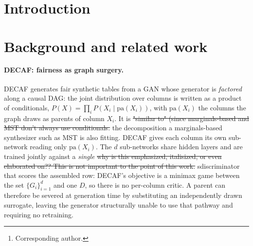 \documentclass{article}
\title{\wkTitle}
\author{%
  Steven Golob\thanks{Corresponding author.} \\
  University of Washington Tacoma \\
  \texttt{golobs@uw.edu} \\
  \And
  Sikha Pentyala \\
  University of Washington Tacoma \\
  \And
  Martine De Cock \\
  University of Washington Tacoma \\
}
\begin{document}
\maketitle

\begin{abstract}
\wkAbstract
\end{abstract}

\section{Introduction}
\wkIntro

\section{Background and related work}
\label{sec:related}

\paragraph{DECAF: fairness as graph surgery.}
DECAF \citep{vanbreugel2021decaf} generates fair synthetic tables from a GAN whose
generator is \emph{factored} along a causal DAG: the joint distribution over
columns is written as a product of conditionals, $P(X) = \prod_i P(X_i \mid
\mathrm{pa}(X_i))$, with $\mathrm{pa}(X_i)$ the columns the graph draws as parents
of column $X_i$. It is \st{"similar to" (since marginals-based and MST don't always use conditionals. } the decomposition a marginals-based synthesizer such as MST
is also fitting. DECAF gives each column its own sub-network reading only
$\mathrm{pa}(X_i)$. The $d$ sub-networks share hidden layers and are trained
jointly against a \emph{single} \st{why is this emphasized, italisized, or even elaborated on?? This is not important to the point of this work.} sdiscriminator that scores the assembled row: DECAF's
objective is a minimax game between the set $\{G_i\}_{i=1}^{d}$ and one $D$, so
there is no per-column critic. A parent can therefore be severed at generation time
by substituting an independently drawn surrogate, leaving the generator
structurally unable to use that pathway and requiring no retraining.
\end{document}
